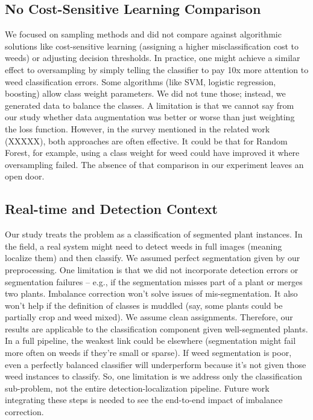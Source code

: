 \documentclass[agriengineering,article,submit,pdftex,moreauthors]{Definitions/mdpi}
\begin{document}
\subsection{No Cost-Sensitive Learning Comparison}
We focused on sampling methods and did not compare against algorithmic solutions like cost-sensitive learning (assigning a higher misclassification cost to weeds) or adjusting decision thresholds. In practice, one might achieve a similar effect to oversampling by simply telling the classifier to pay 10x more attention to weed classification errors. Some algorithms (like SVM, logistic regression, boosting) allow class weight parameters. We did not tune those; instead, we generated data to balance the classes. A limitation is that we cannot say from our study whether data augmentation was better or worse than just weighting the loss function. However, in the survey mentioned in the related work (XXXXX), both approaches are often effective. It could be that for Random Forest, for example, using a class weight for weed could have improved it where oversampling failed. The absence of that comparison in our experiment leaves an open door.

\subsection{Real-time and Detection Context}
Our study treats the problem as a classification of segmented plant instances. In the field, a real system might need to detect weeds in full images (meaning localize them) and then classify. We assumed perfect segmentation given by our preprocessing. One limitation is that we did not incorporate detection errors or segmentation failures – e.g., if the segmentation misses part of a plant or merges two plants. Imbalance correction won’t solve issues of mis-segmentation. It also won’t help if the definition of classes is muddled (say, some plants could be partially crop and weed mixed). We assume clean assignments. Therefore, our results are applicable to the classification component given well-segmented plants. In a full pipeline, the weakest link could be elsewhere (segmentation might fail more often on weeds if they’re small or sparse). If weed segmentation is poor, even a perfectly balanced classifier will underperform because it’s not given those weed instances to classify. So, one limitation is we address only the classification sub-problem, not the entire detection-localization pipeline. Future work integrating these steps is needed to see the end-to-end impact of imbalance correction.
\end{document}
